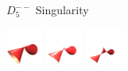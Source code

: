 \begin{surferPage}[D5-- Singularity]{$D_5^{--}$ Singularity}
    \vspace{-1ex}
	\begin{Centering*}%
		\includegraphics[width=1.2cm]{../../common/images/D5mm_01}\quad%
		\includegraphics[width=1.2cm]{../../common/images/D5mm_04}\quad%
		\includegraphics[width=1.2cm]{../../common/images/D5mm_05}%
	\end{Centering*}
\end{surferPage}
